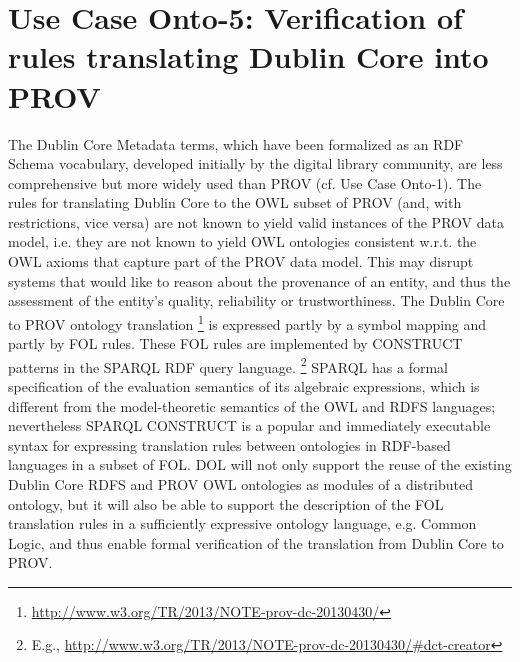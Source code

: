 \documentclass[10pt,%
\ifpretendfinal
final%
\else
draft%
\fi,
]{scrreprt}
\begin{document}
\section{Use Case Onto-5: Verification of rules translating Dublin Core into PROV}
The Dublin Core Metadata terms, which have been formalized as an RDF Schema vocabulary, developed initially by the digital library community, are less 
comprehensive but more widely used than PROV (cf. Use Case Onto-1). The rules for translating Dublin Core to the OWL subset of PROV (and, with restrictions, 
vice versa) are not known to yield valid instances of the PROV data model, i.e. they are not known to yield OWL ontologies consistent w.r.t. the OWL axioms that 
capture part of the PROV data model. This may disrupt systems that would like to reason about the provenance of an entity, and thus the assessment of the 
entity's quality, reliability or trustworthiness.
The Dublin Core to PROV ontology translation%
\footnote{\url{http://www.w3.org/TR/2013/NOTE-prov-dc-20130430/}}
  is expressed partly by a symbol mapping and partly by FOL rules. These FOL rules are implemented by CONSTRUCT patterns in the SPARQL RDF query language.%
\footnote{E.g., \url{http://www.w3.org/TR/2013/NOTE-prov-dc-20130430/\#dct-creator}} 
SPARQL has a formal specification of the evaluation semantics of its algebraic expressions, which is different from the model-theoretic semantics of the OWL and RDFS languages; nevertheless SPARQL CONSTRUCT is a popular and immediately executable syntax for expressing translation rules between ontologies in RDF-based languages in a subset of FOL.
DOL will not only support the reuse of the existing Dublin Core RDFS and PROV OWL ontologies as modules of a distributed ontology, but it will also be able to support the description of the FOL translation rules in a sufficiently expressive ontology language, e.g. Common Logic, and thus enable formal verification of the translation from Dublin Core to PROV.
\end{document}
